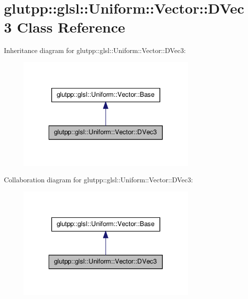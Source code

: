 \hypertarget{classglutpp_1_1glsl_1_1Uniform_1_1Vector_1_1DVec3}{\section{glutpp\-:\-:glsl\-:\-:\-Uniform\-:\-:\-Vector\-:\-:\-D\-Vec3 \-Class \-Reference}
\label{classglutpp_1_1glsl_1_1Uniform_1_1Vector_1_1DVec3}
}


\-Inheritance diagram for glutpp\-:\-:glsl\-:\-:\-Uniform\-:\-:\-Vector\-:\-:\-D\-Vec3\-:\nopagebreak
\begin{figure}[H]
\begin{center}
\leavevmode
\includegraphics[width=254pt]{classglutpp_1_1glsl_1_1Uniform_1_1Vector_1_1DVec3__inherit__graph}
\end{center}
\end{figure}


\-Collaboration diagram for glutpp\-:\-:glsl\-:\-:\-Uniform\-:\-:\-Vector\-:\-:\-D\-Vec3\-:\nopagebreak
\begin{figure}[H]
\begin{center}
\leavevmode
\includegraphics[width=254pt]{classglutpp_1_1glsl_1_1Uniform_1_1Vector_1_1DVec3__coll__graph}
\end{center}
\end{figure}
